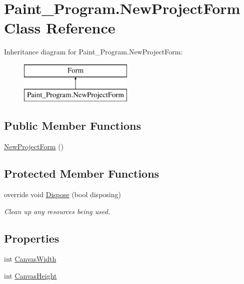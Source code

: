 \hypertarget{class_paint___program_1_1_new_project_form}{}\section{Paint\+\_\+\+Program.\+New\+Project\+Form Class Reference}
\label{class_paint___program_1_1_new_project_form}
Inheritance diagram for Paint\+\_\+\+Program.\+New\+Project\+Form\+:\begin{figure}[H]
\begin{center}
\leavevmode
\includegraphics[height=2.000000cm]{class_paint___program_1_1_new_project_form}
\end{center}
\end{figure}
\subsection*{Public Member Functions}
\begin{DoxyCompactItemize}
\item 
\mbox{\hyperlink{class_paint___program_1_1_new_project_form_a9d6022141bf286fea16115218f1f16ea}{New\+Project\+Form}} ()
\end{DoxyCompactItemize}
\subsection*{Protected Member Functions}
\begin{DoxyCompactItemize}
\item 
override void \mbox{\hyperlink{class_paint___program_1_1_new_project_form_a48d91b7fc622b68f9c6a665051a4548f}{Dispose}} (bool disposing)
\begin{DoxyCompactList}\small\item\em Clean up any resources being used. \end{DoxyCompactList}\end{DoxyCompactItemize}
\subsection*{Properties}
\begin{DoxyCompactItemize}
\item 
int \mbox{\hyperlink{class_paint___program_1_1_new_project_form_a60a41bc537a843dacb79c67b4cc6ac5f}{Canvas\+Width}}
\item 
int \mbox{\hyperlink{class_paint___program_1_1_new_project_form_a14997bfb0df33e50fc9125b8cfd25238}{Canvas\+Height}}
\end{DoxyCompactItemize}
